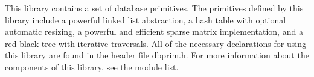 

This library contains a set of database primitives. The primitives defined by this library include a powerful linked list abstraction, a hash table with optional automatic resizing, a powerful and efficient sparse matrix implementation, and a red-black tree with iterative traversals. All of the necessary declarations for using this library are found in the header file dbprim.h. For more information about the components of this library, see the module list.

